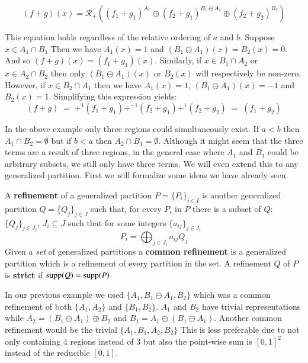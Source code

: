 \begin{equation*}
	(f+g)(x) = \mathcal{R}_+ \left( (f_1 + g_1)^{A_1} 
			\oplus (f_2 + g_1)^{B_1 \ominus A_1} 
			\oplus (f_2 + g_2)^{B_2} \right)
\end{equation*}


This equation holds regardless of the relative ordering of $a$ and $b$.
Suppose $x \in A_1 \cap B_1$
Then we have $A_1(x)= 1$ and $(B_1 \ominus A_1)(x) = B_2(x) = 0$.
And so $(f+g)(x) = (f_1 + g_1)(x)$.
Similarly, if $x \in B_1 \cap A_2$ or $x \in A_2 \cap B_2$ then 
only $(B_1 \ominus A_1)(x)$ or $B_2(x)$ will respectively be non-zero.
However, if $x \in B_2 \cap A_1$ then we have $A_1(x) = 1$, $(B_1 \ominus A_1)(x) = -1$ and $B_2(x) = 1$.
Simplifying this expression yields:
\begin{equation*}
	(f+g) \;=\; +^1 (f_1 + g_1) +^{-1} (f_2 + g_1) +^1 (f_2 + g_2) \;=\; (f_1 + g_2)
\end{equation*}


In the above example only three regions could simultaneously exist.
If $a<b$ then $A_1 \cap B_2 = \emptyset$ but if $b<a$ then $A_2 \cap B_1 = \emptyset$.
Although it might seem that the three terms are a result of three regions, in the general case where 
$A_1$ and $B_1$ could be arbitrary subsets, we still only have three terms.
We will even extend this to any generalized partition.
First we will formalize some ideas we have already seen.


\begin{definition}
	A \textbf{refinement} of a generalized partition $P = \{P_i\}_{i \in I}$ is another generalized partition
	$Q = \{Q_j \}_{j \in J}$ such that, for every $P_i$ in $P$ there is a subset of $Q$: $\{ Q_{j} \}_{j \in J_i}$, 
	$J_i \subseteq J$ such that for some integers $\{a_{ij}\}_{j \in J_i}$
	\begin{equation}
		P_i = \bigoplus_{j \in J_i} a_{ij} Q_{j}
	\end{equation}
	Given a \emph{set} of generalized partitions a \textbf{common refinement} is a generalized partition which is a 
	refinement of every partition in the set. 
	A refinement $Q$ of $P$ is \textbf{strict} if $\text{supp}(Q) = \text{supp}(P)$.
\end{definition}




In our previous example we used $\{ A_1, B_1 \ominus A_1, B_2 \}$ which was a common refinement of both
$\{ A_1, A_2 \}$ and $\{ B_1, B_2 \}$.
$A_1$ and $B_2$ have trivial representations while $A_2 = (B_1 \ominus A_1) \oplus B_2$ and 
$B_1 = A_1 \oplus (B_1 \ominus A_1)$.
Another common refinement would be the trivial $\{ A_1, B_1, A_2, B_2 \}$
This is less preferable due to not only containing 4 regions instead of 3 but also the point-wise sum is $[0,1]^2$
instead of the reducible $[0,1]$.

